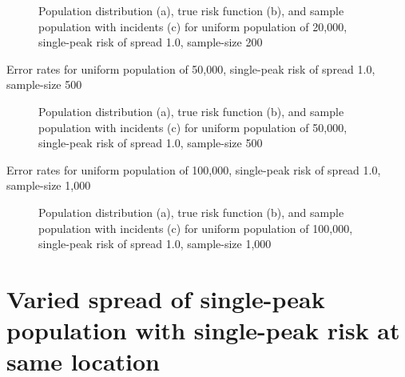 \begin{figure}[H]
    
    \caption[]{Population distribution (a), true risk function (b), and sample population with incidents (c) for uniform population of 20,000, single-peak risk of \gls{spread} 1.0, sample-size 200}
    \label{fig:distributions:unif20k_200_1.0_1h}    
\end{figure}



\begin{table}[H]
    
    \caption[]{Error rates for uniform population of 50,000, single-peak risk of \gls{spread} 1.0, sample-size 500}
    \label{tab:mean_error_rates:unif50k_500_1.0_1h}
\end{table}

\begin{figure}[H]
    
    \caption[]{Population distribution (a), true risk function (b), and sample population with incidents (c) for uniform population of 50,000, single-peak risk of \gls{spread} 1.0, sample-size 500}
    \label{fig:distributions:unif50k_500_1.0_1h}    
\end{figure}



\begin{table}[H]
    
    \caption[]{Error rates for uniform population of 100,000, single-peak risk of \gls{spread} 1.0, sample-size 1,000}
    \label{tab:mean_error_rates:unif100k_1000_1.0_1h}
\end{table}

\begin{figure}[H]
    
    \caption[]{Population distribution (a), true risk function (b), and sample population with incidents (c) for uniform population of 100,000, single-peak risk of \gls{spread} 1.0, sample-size 1,000}
    \label{fig:distributions:unif100k_1000_1.0_1h}    
\end{figure}



\section{Varied spread of single-peak population with single-peak risk at same location}
\label{sec:app:results_pX_100_1.0_1h}

